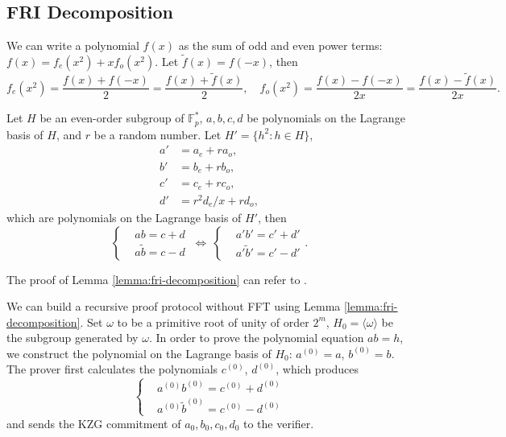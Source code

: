 \subsection{FRI Decomposition}

We can write a polynomial $f(x)$ as the sum of odd and even power terms: $f(x)=f_e(x^2)+xf_o(x^2)$.
Let $\tilde{f}(x)=f(-x)$, then
\[
    f_e(x^2) = \frac{f(x)+f(-x)}{2} = \frac{f(x)+\tilde{f}(x)}{2},
    \quad
    f_o(x^2) = \frac{f(x)-f(-x)}{2x} = \frac{f(x)-\tilde{f}(x)}{2x}.
\]

\begin{lemma} \label{lemma:fri-decomposition}
    Let $H$ be an even-order subgroup of $\mathbb{F}_p^*$, $a,b,c,d$ be polynomials on the Lagrange basis of $H$, and $r$ be a random number.
    Let $H'=\{h^2 : h \in H\}$,
    \begin{align*}
        a' &= a_e + ra_o, \\
        b' &= b_e + rb_o, \\
        c' &= c_e + rc_o, \\
        d' &= r^2d_e/x + rd_o,
    \end{align*}
    which are polynomials on the Lagrange basis of $H'$, then
    \[
        \left\{ \begin{aligned}
            & ab = c + d \\
            & a\tilde{b} = c - d
        \end{aligned} \right.
        \ \Longleftrightarrow \
        \left\{ \begin{aligned}
            & a'b' = c' + d' \\
            & a'\tilde{b}' = c' - d'
        \end{aligned} \right. .
    \]
\end{lemma}
The proof of Lemma \ref{lemma:fri-decomposition} can refer to \cite{website:hadamard-check-without-fft}.

We can build a recursive proof protocol without FFT using Lemma \ref{lemma:fri-decomposition}.
Set $\omega$ to be a primitive root of unity of order $2^m$, $H_0=\langle\omega\rangle$ be the subgroup generated by $\omega$.
In order to prove the polynomial equation $ab=h$, we construct the polynomial on the Lagrange basis of $H_0$: $a^{(0)}=a$, $b^{(0)}=b$.
The prover first calculates the polynomials $c^{(0)}$, $d^{(0)}$, which produces
\[
    \left\{ \begin{aligned}
        & a^{(0)}b^{(0)} = c^{(0)} + d^{(0)} \\
        & a^{(0)}\tilde{b}^{(0)} = c^{(0)} - d^{(0)}
    \end{aligned} \right.
\]
and sends the KZG commitment of $a_0,b_0,c_0,d_0$ to the verifier.

